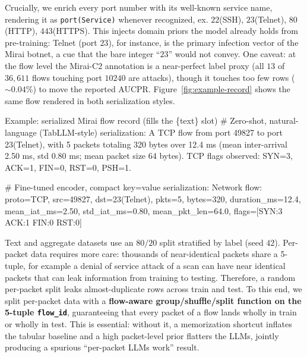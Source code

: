 \documentclass{jmlr}
\begin{document}
Crucially, we enrich every port number with its well-known service name, rendering it as \texttt{port(Service)} whenever recognized, ex. $22$(SSH), $23$(Telnet), $80$(HTTP), $443$(HTTPS). This injects domain priors the model already holds from pre-training: Telnet (port $23$), for instance, is the primary infection vector of the Mirai botnet, a cue that the bare integer ``$23$'' would not convey. One caveat: at the flow level the Mirai-C2 annotation is a near-perfect label proxy (all $13$ of $36{,}611$ flows touching port $10240$ are attacks), though it touches too few rows (${\sim}0.04\%$) to move the reported AUCPR. Figure~\ref{fig:example-record} shows the same flow rendered in both serialization styles.

\begin{promptbox}{Example: serialized Mirai flow record (fills the \{text\} slot)}
# Zero-shot, natural-language (TabLLM-style) serialization:
A TCP flow from port 49827 to port 23(Telnet), with 5 packets totaling
320 bytes over 12.4 ms (mean inter-arrival 2.50 ms, std 0.80 ms; mean
packet size 64 bytes). TCP flags observed: SYN=3, ACK=1, FIN=0, RST=0, PSH=1.

# Fine-tuned encoder, compact key=value serialization:
Network flow: proto=TCP, src=49827, dst=23(Telnet), pkts=5, bytes=320,
duration_ms=12.4, mean_iat_ms=2.50, std_iat_ms=0.80, mean_pkt_len=64.0,
flags=[SYN:3 ACK:1 FIN:0 RST:0]
\end{promptbox}
\label{fig:example-record}

Text and aggregate datasets use an $80/20$ split stratified by label (seed $42$). Per-packet data requires more care: thousands of near-identical packets share a 5-tuple, for example a denial of service attack of a scan can have near identical packets that can leak information from training to testing. Therefore, a random per-packet split leaks almost-duplicate rows across train and test. To this end, we split per-packet data with a \textbf{flow-aware group/shuffle/split function on the 5-tuple \texttt{flow\_id}}, guaranteeing that every packet of a flow lands wholly in train or wholly in test. This is essential: without it, a memorization shortcut inflates the tabular baseline and a high packet-level prior flatters the LLMs, jointly producing a spurious ``per-packet LLMs work'' result.
\end{document}
